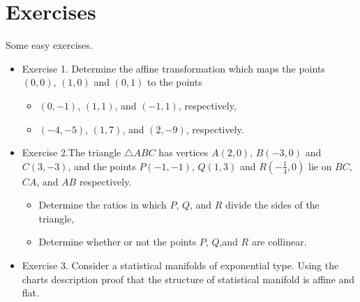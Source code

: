 \section{Exercises}
Some easy exercises. 
\begin{itemize}
\item Exercise 1. Determine the affine transformation which maps the points $(0,0)$, $(1,0)$ and $(0,1)$ to the points
\begin{itemize}
    \item $(0,-1)$, $(1,1)$, and $(-1,1)$, respectively,
    \item $(-4,-5)$, $(1,7)$, and $(2,-9)$, respectively.
\end{itemize}
\item Exercise 2.The triangle $\bigtriangleup ABC$  has vertices $A(2,0)$, $B(-3,0)$ and $C(3,-3)$, and the points $P(-1,-1)$, $Q(1,3)$ and $R(-\frac{1}{4},0)$ lie on $BC$, $CA$, and $AB$ respectively.
\begin{itemize}
    \item Determine the ratios in which $P$, $Q$, and $R$ divide the sides of the triangle,
     \item Determine whether or not the points $P$, $Q$,and $R$ are collinear.
\end{itemize}
\item Exercise 3. Consider a statistical manifolds of exponential type. Using the charts description proof that the structure of statistical manifold is affine and flat.
\end{itemize}

\,
